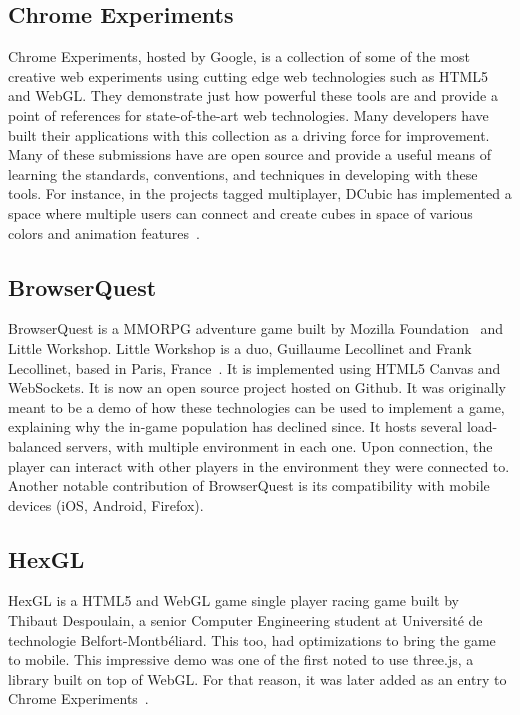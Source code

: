 \documentclass{acmsiggraph}
\begin{document}
    \subsection{Chrome Experiments}
    Chrome Experiments, hosted by Google, is a collection of some of the most creative web experiments using cutting edge web technologies such as HTML5 and WebGL. They demonstrate just how powerful these tools are and provide a point of references for state-of-the-art web technologies. Many developers have built their applications with this collection as a driving force for improvement. Many of these submissions have are open source and provide a useful means of learning the standards, conventions, and techniques in developing with these tools. For instance, in the projects tagged multiplayer, DCubic has implemented a space where multiple users can connect and create cubes in space of various colors and animation features~\cite{P12}.

    \subsection{BrowserQuest}
    BrowserQuest is a MMORPG adventure game built by Mozilla Foundation~\cite{AJK13} and Little Workshop. Little Workshop is a duo, Guillaume Lecollinet and Frank Lecollinet, based in Paris, France~\cite{LL12}. It is implemented using HTML5 Canvas and WebSockets. It is now an open source project hosted on Github. It was originally meant to be a demo of how these technologies can be used to implement a game, explaining why the in-game population has declined since. It hosts several load-balanced servers, with multiple environment in each one. Upon connection, the player can interact with other players in the environment they were connected to. Another notable contribution of BrowserQuest is its compatibility with mobile devices (iOS, Android, Firefox).

    \subsection{HexGL}
    HexGL is a HTML5 and WebGL game single player racing game built by Thibaut Despoulain, a senior Computer Engineering student at Université de technologie Belfort-Montbéliard. This too, had optimizations to bring the game to mobile. This impressive demo was one of the first noted to use three.js, a library built on top of WebGL. For that reason, it was later added as an entry to Chrome Experiments~\cite{D12}.
\end{document}
